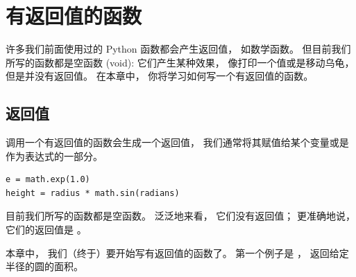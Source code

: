 
\chapter{有返回值的函数}
\label{fruitchap}


许多我们前面使用过的 Python 函数都会产生返回值， 如数学函数。
但目前我们所写的函数都是空函数 (void): 它们产生某种效果， 像打印一个值或是移动乌龟，但是并没有返回值。
在本章中， 你将学习如何写一个有返回值的函数。

\section{返回值}
  


调用一个有返回值的函数会生成一个返回值， 我们通常将其赋值给某个变量或是作为表达式的一部分。

\begin{lstlisting}
e = math.exp(1.0)
height = radius * math.sin(radians)
\end{lstlisting}

%

目前我们所写的函数都是空函数。
泛泛地来看， 它们没有返回值； 更准确地说， 它们的返回值是  。


本章中， 我们（终于）要开始写有返回值的函数了。
第一个例子是  ， 返回给定半径的圆的面积。

